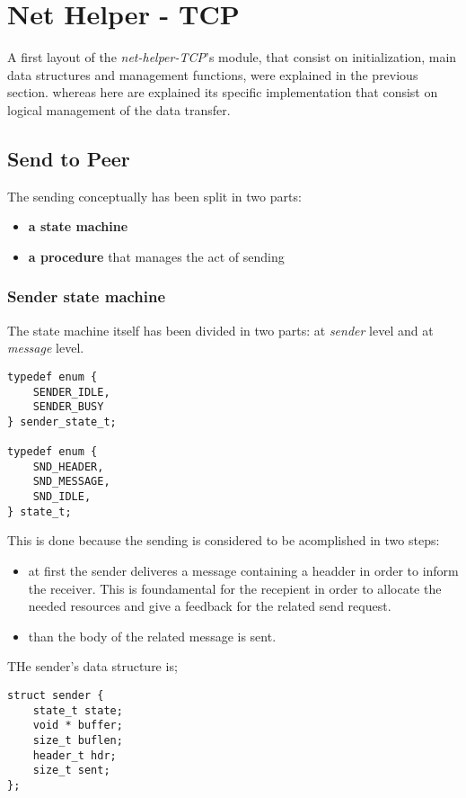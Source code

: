 \section{Net Helper - TCP}
A first layout of the \textit{net-helper-TCP}'s module, that consist on initialization, main data structures
and management functions, were explained in the previous section. whereas here are explained its specific implementation that consist on logical management of the data transfer.

\subsection{Send to Peer}
The sending conceptually has been split in two parts:
\begin{itemize}
  \item \textbf{a state machine} 
  \item \textbf{a procedure} that manages the act of sending
\end{itemize}


\subsubsection{Sender state machine}
The state machine itself has been divided in two parts: at \textit{sender} level and at \textit{message} level.
\begin{lstlisting}
typedef enum {
    SENDER_IDLE,
    SENDER_BUSY
} sender_state_t;

typedef enum {
    SND_HEADER,
    SND_MESSAGE,
    SND_IDLE,
} state_t;
\end{lstlisting}
This is done because the sending is considered to be acomplished in two steps:
\begin{itemize}
  \item at first the sender deliveres a message containing a headder in order to inform the receiver. This is
        foundamental for the recepient in order to allocate the needed resources and give a feedback for the
        related send request.
  \item than the body of the related message is sent.
\end{itemize}

THe sender's data structure is;
\begin{lstlisting}
struct sender {
    state_t state;
    void * buffer;
    size_t buflen;
    header_t hdr;
    size_t sent;
};
\end{lstlisting}


